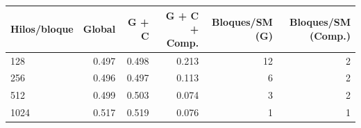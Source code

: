 \begin{tabular}{lrrrrr}
\toprule
Hilos/bloque & Global & G + C & G + C + Comp. & Bloques/SM (G) & Bloques/SM (Comp.) \\
\midrule
128 & 0.497 & 0.498 & 0.213 & 12 & 2 \\
256 & 0.496 & 0.497 & 0.113 & 6 & 2 \\
512 & 0.499 & 0.503 & 0.074 & 3 & 2 \\
1024 & 0.517 & 0.519 & 0.076 & 1 & 1 \\
\bottomrule
\end{tabular}
